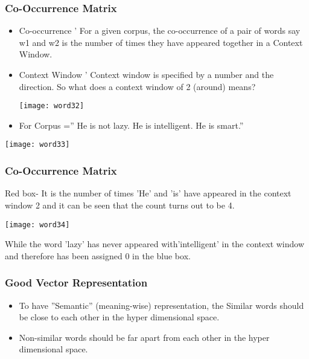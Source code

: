 \begin{frame}[fragile]\frametitle{Co-Occurrence Matrix}
\begin{itemize}
\item Co-occurrence ' For a given corpus, the co-occurrence of a pair of words say w1 and w2 is the number of times they have appeared together in a Context Window.
\item Context Window ' Context window is specified by a number and the direction. So what does a context window of 2 (around) means?
\begin{center}
\texttt{[image: word32]}
\end{center}
\item For Corpus ='' He is not lazy. He is intelligent. He is smart.''
\end{itemize}
\begin{center}
\texttt{[image: word33]}
\end{center}
\end{frame}

\begin{frame}[fragile]\frametitle{Co-Occurrence Matrix}
Red box- It is the number of times 'He' and 'is' have appeared in the context window 2 and it can be seen that the count turns out to be 4. 
\begin{center}
\texttt{[image: word34]}
\end{center}
While the word 'lazy' has never appeared with'intelligent' in the context window and therefore has been assigned 0 in the blue box.
\end{frame}



\begin{frame}[fragile]\frametitle{Good Vector Representation}
\begin{itemize}
\item To have ''Semantic'' (meaning-wise) representation, the Similar words should be close to each other in the hyper dimensional space.
\item Non-similar words should be far apart from each other in the hyper dimensional space.
\end{itemize}
\end{frame}

